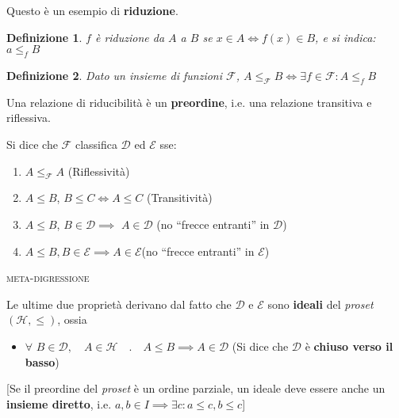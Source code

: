 \documentclass[a4paper,10pt,oneside]{article}
\theoremstyle{break}
\newtheorem{deff}{Definizione}[section]
\begin{document}
Questo è un esempio di \textbf{riduzione}.

\begin{deff}
 $f$ è riduzione da $A$ a $B$ se $x \in A \iff f(x) \in B$, e si indica: $a \leq_f B$
\end{deff}
\begin{deff}
Dato un insieme di funzioni $\mathcal{F}$, $A \leq_\mathcal{F}B \iff \exists f \in \mathcal F : A \leq_f B$
\end{deff}

\begin{center}
\end{center}

Una relazione di riducibilità è un \textbf{preordine}, i.e. una relazione transitiva e riflessiva.

Si dice che $\mathcal F$ classifica $\mathcal D$ ed $\mathcal E$ sse:
\begin{enumerate}
 \item $A \leq_\mathcal{F} A$ \hfill (Riflessività)
 \item $A \leq B$, $B \leq C \iff A \leq C$ \hfill(Transitività)
 \item $A \leq B$, $B \in \mathcal D \implies$ $A \in \mathcal D$ \hfill(no ``frecce entranti'' in $\mathcal D$)
 \item $A \leq B, B \in \mathcal E \implies A \in \mathcal E$\hfill(no ``frecce entranti'' in $\mathcal E$)
\end{enumerate}\medskip

\dotfill \textsc{meta-digressione}\dotfill

Le ultime due proprietà derivano dal fatto che $\mathcal D$ e $\mathcal E$ sono \textbf{ideali} del \emph{proset} $(\mathcal H, \leq)$, ossia

\begin{itemize}
 \item $\forall\,\, B \in \mathcal D ,\quad A \in \mathcal H \quad.\quad A \leq B \implies A \in \mathcal D$ \hfill (Si dice che $\mathcal D$ è \textbf{chiuso verso il basso})
\end{itemize}
 [Se il preordine del \emph{proset} è un ordine parziale, un ideale deve essere anche un \textbf{insieme diretto}, i.e. $a, b \in I \implies \exists c : a \leq c, b \leq c$]
\end{document}
